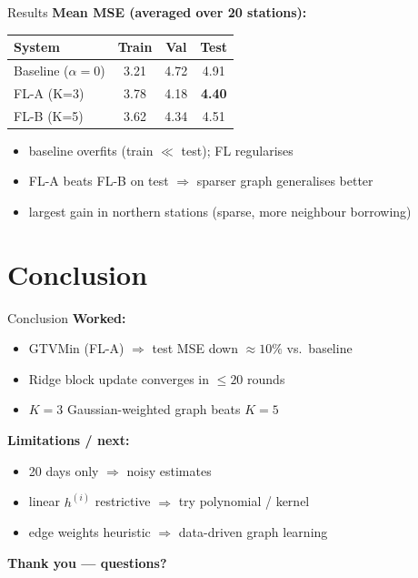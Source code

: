 \documentclass[12pt]{beamer}
\newcommand{\nodeidx}{i}
\begin{document}
\begin{frame}{Results}
\textbf{Mean MSE (averaged over 20 stations):}

\vspace{3mm}
\begin{center}
\renewcommand{\arraystretch}{1.25}
\begin{tabular}{lccc}
\hline
\textbf{System} & \textbf{Train} & \textbf{Val} & \textbf{Test} \\
\hline
Baseline ($\alpha = 0$)            & 3.21 & 4.72 & 4.91 \\
FL-A (K=3)                          & 3.78 & 4.18 & \textbf{4.40} \\
FL-B (K=5)                          & 3.62 & 4.34 & 4.51 \\
\hline
\end{tabular}
\end{center}

\vspace{3mm}
\begin{itemize}\setlength{\itemsep}{2mm}
    \item baseline overfits (train $\ll$ test); FL regularises
    \item FL-A beats FL-B on test $\Rightarrow$ sparser graph generalises better
    \item largest gain in northern stations (sparse, more neighbour borrowing)
\end{itemize}
\end{frame}


\section{Conclusion}

\begin{frame}{Conclusion}
\textbf{Worked:}
\begin{itemize}\setlength{\itemsep}{2mm}
    \item GTVMin (FL-A) $\Rightarrow$ test MSE down $\approx 10\%$ vs.\ baseline
    \item Ridge block update converges in $\leq 20$ rounds
    \item $K\!=\!3$ Gaussian-weighted graph beats $K\!=\!5$
\end{itemize}

\vspace{4mm}
\textbf{Limitations / next:}
\begin{itemize}\setlength{\itemsep}{2mm}
    \item 20 days only $\Rightarrow$ noisy estimates
    \item linear $h^{(\nodeidx)}$ restrictive $\Rightarrow$ try polynomial / kernel
    \item edge weights heuristic $\Rightarrow$ data-driven graph learning
\end{itemize}

\vspace{6mm}
\centering\textbf{Thank you --- questions?}
\end{frame}
\end{document}
